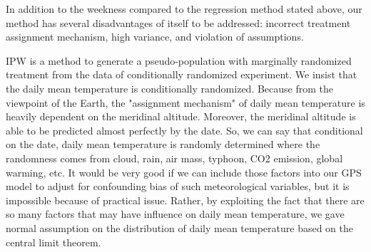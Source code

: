 \documentclass[12pt]{article}
\begin{document}
In addition to the weekness compared to the regression method stated above,
our method has several disadvantages of itself to be addressed:
incorrect treatment assignment mechanism, high variance, and violation of assumptions.

IPW is a method to generate a pseudo-population with marginally randomized treatment
from the data of conditionally randomized experiment.
We insist that the daily mean temperature is conditionally randomized.
Because from the viewpoint of the Earth, 
the "assignment mechanism" of daily mean temperature is heavily dependent on the meridinal altitude.
Moreover, the meridinal altitude is able to be predicted almost perfectly by the date.
So, we can say that conditional on the date, daily mean temperature is randomly determined
where the randomness comes from cloud, rain, air mass, typhoon, CO2 emission, global warming, etc.
It would be very good if we can include those factors into our GPS model 
to adjust for confounding bias of such meteorological variables,
but it is impossible because of practical issue.
Rather, by exploiting the fact that 
there are so many factors that may have influence on daily mean temperature,
we gave normal assumption on the distribution of daily mean temperature 
based on the central limit theorem.

\end{document}
